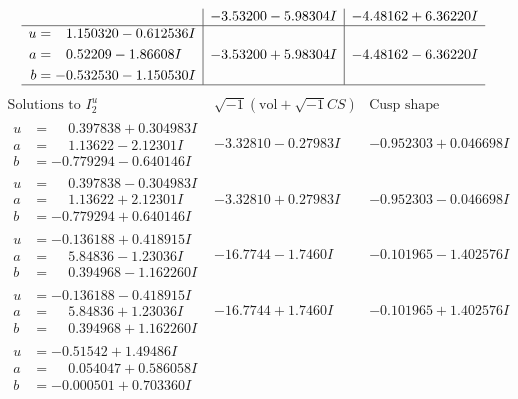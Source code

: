 \documentclass[1p]{elsarticle_modified}
\theoremstyle{definition}
\newcommand{\I}{\sqrt{-1}}
\begin{document}
$$\begin{array}{c|c|c}
 & -3.53200 - 5.98304 I & -4.48162 + 6.36220 I \\ \hline\begin{aligned}
u &= \phantom{-}1.150320 - 0.612536 I \\
a &= \phantom{-}0.52209 - 1.86608 I \\
b &= -0.532530 - 1.150530 I\end{aligned}
 & -3.53200 + 5.98304 I & -4.48162 - 6.36220 I\\
 \hline 
 \end{array}$$\newpage$$\begin{array}{c|c|c}  
\text{Solutions to }I^u_{2}& \I (\text{vol} + \sqrt{-1}CS) & \text{Cusp shape}\\
 \hline 
\begin{aligned}
u &= \phantom{-}0.397838 + 0.304983 I \\
a &= \phantom{-}1.13622 - 2.12301 I \\
b &= -0.779294 - 0.640146 I\end{aligned}
 & -3.32810 - 0.27983 I & -0.952303 + 0.046698 I \\ \hline\begin{aligned}
u &= \phantom{-}0.397838 - 0.304983 I \\
a &= \phantom{-}1.13622 + 2.12301 I \\
b &= -0.779294 + 0.640146 I\end{aligned}
 & -3.32810 + 0.27983 I & -0.952303 - 0.046698 I \\ \hline\begin{aligned}
u &= -0.136188 + 0.418915 I \\
a &= \phantom{-}5.84836 - 1.23036 I \\
b &= \phantom{-}0.394968 - 1.162260 I\end{aligned}
 & -16.7744 - 1.7460 I & -0.101965 - 1.402576 I \\ \hline\begin{aligned}
u &= -0.136188 - 0.418915 I \\
a &= \phantom{-}5.84836 + 1.23036 I \\
b &= \phantom{-}0.394968 + 1.162260 I\end{aligned}
 & -16.7744 + 1.7460 I & -0.101965 + 1.402576 I \\ \hline\begin{aligned}
u &= -0.51542 + 1.49486 I \\
a &= \phantom{-}0.054047 + 0.586058 I \\
b &= -0.000501 + 0.703360 I\end{aligned}

\end{array}$$
\end{document}
